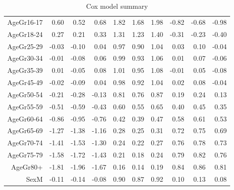 \begin{table}[ht]
\begin{tabular}{rrrrrrrrrr}
  AgeGr16-17 & 0.60 & 0.52 & 0.68 & 1.82 & 1.68 & 1.98 & -0.82 & -0.68 & -0.98 \\ 
  AgeGr18-24 & 0.27 & 0.21 & 0.33 & 1.31 & 1.23 & 1.40 & -0.31 & -0.23 & -0.40 \\ 
  AgeGr25-29 & -0.03 & -0.10 & 0.04 & 0.97 & 0.90 & 1.04 & 0.03 & 0.10 & -0.04 \\ 
  AgeGr30-34 & -0.01 & -0.08 & 0.06 & 0.99 & 0.93 & 1.06 & 0.01 & 0.07 & -0.06 \\ 
  AgeGr35-39 & 0.01 & -0.05 & 0.08 & 1.01 & 0.95 & 1.08 & -0.01 & 0.05 & -0.08 \\ 
  AgeGr45-49 & -0.02 & -0.09 & 0.04 & 0.98 & 0.92 & 1.04 & 0.02 & 0.08 & -0.04 \\ 
  AgeGr50-54 & -0.21 & -0.28 & -0.13 & 0.81 & 0.76 & 0.87 & 0.19 & 0.24 & 0.13 \\ 
  AgeGr55-59 & -0.51 & -0.59 & -0.43 & 0.60 & 0.55 & 0.65 & 0.40 & 0.45 & 0.35 \\ 
  AgeGr60-64 & -0.86 & -0.95 & -0.76 & 0.42 & 0.39 & 0.47 & 0.58 & 0.61 & 0.53 \\ 
  AgeGr65-69 & -1.27 & -1.38 & -1.16 & 0.28 & 0.25 & 0.31 & 0.72 & 0.75 & 0.69 \\ 
  AgeGr70-74 & -1.41 & -1.53 & -1.30 & 0.24 & 0.22 & 0.27 & 0.76 & 0.78 & 0.73 \\ 
  AgeGr75-79 & -1.58 & -1.72 & -1.43 & 0.21 & 0.18 & 0.24 & 0.79 & 0.82 & 0.76 \\ 
  AgeGr80+ & -1.81 & -1.96 & -1.67 & 0.16 & 0.14 & 0.19 & 0.84 & 0.86 & 0.81 \\ 
  SexM & -0.11 & -0.14 & -0.08 & 0.90 & 0.87 & 0.92 & 0.10 & 0.13 & 0.08 \\ 
   \hline
\end{tabular}
\caption{Cox model summary} 
\end{table}
